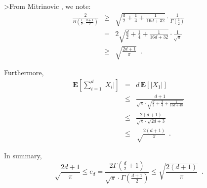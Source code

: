 \documentclass[charterfonts,lotsofwhite]{patmorin}
\newcommand{\E}{\mathbf{E}}
\begin{document}
>From Mitrinovic \cite[p.~286]{m70}, we note:
\begin{eqnarray}
\frac{2}{B(\frac{1}{2},\frac{d+1}{2})} & \ge &
  \sqrt{\frac{d}{2}+\frac{1}{4}+\frac{1}{16d+32}}\cdot 
     \frac{1}{\Gamma(\frac{1}{2})} \\
 & = & 2\sqrt{\frac{d}{2}+\frac{1}{4}+\frac{1}{16d+32}}\cdot
      \frac{1}{\sqrt{\pi}} \\
 & \ge & \sqrt{\frac{2d+1}{\pi}} \enspace .
\end{eqnarray}

Furthermore,
\begin{eqnarray*}
\E\left[\sum_{i=1}^d|X_i|\right] & = & d\,\E[|X_1|] \\
  & \le & \frac{d+1}{\sqrt{\pi}\cdot\sqrt{\frac{d}{2}+
                       \frac{3}{4}+\frac{1}{16d+48}}} \\
  & \le & \frac{2(d+1)}{\sqrt{\pi}\cdot\sqrt{2d+3}} \\ 
  & \le & \sqrt\frac{2(d+1)}{\pi} \enspace . 
\end{eqnarray*}

In summary,
\[
\sqrt\frac{2d+1}{\pi} \le c_d = \frac{2\Gamma(\frac{d}{2}+1)}
                            {\sqrt{\pi}\cdot\Gamma(\frac{d+1}{2})}
 \le \sqrt{\frac{2(d+1)}{\pi}} \enspace .
\]
\end{document}
